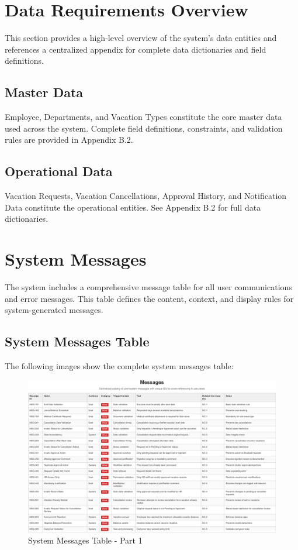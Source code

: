 \documentclass[12pt,a4paper]{article}
\begin{document}
\section{Data Requirements Overview}

This section provides a high-level overview of the system's data entities and references a centralized appendix for complete data dictionaries and field definitions.

\subsection{Master Data}
Employee, Departments, and Vacation Types constitute the core master data used across the system. Complete field definitions, constraints, and validation rules are provided in Appendix B.2.

\subsection{Operational Data}
Vacation Requests, Vacation Cancellations, Approval History, and Notification Data constitute the operational entities. See Appendix B.2 for full data dictionaries.

\section{System Messages}

The system includes a comprehensive message table for all user communications and error messages. This table defines the content, context, and display rules for system-generated messages.

\subsection{System Messages Table}
The following images show the complete system messages table:

\begin{figure}[H]
\centering
\includegraphics[width=1.0\textwidth]{Use-Cases/Messages-Table/Messages-Table-1.png}
\caption{System Messages Table - Part 1}
\label{fig:messages-table-1}
\end{figure}
\end{document}
